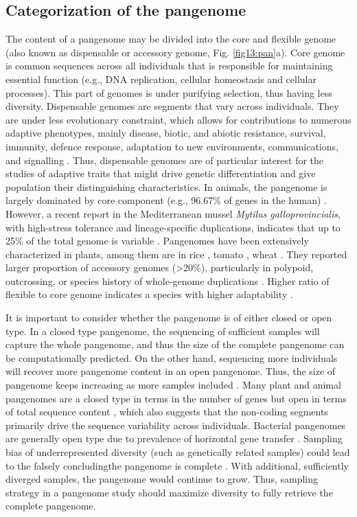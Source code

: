 \documentclass[../main.tex]{subfiles}
\begin{document}
\subsection*{Categorization of the pangenome}

The content of a pangenome may be divided into the core and flexible genome (also known  as dispensable or accessory genome, Fig. \ref{fig13:pan}a). Core genome is common sequences across all individuals that is responsible for maintaining essential function (e.g., DNA replication, cellular homeostasis and cellular processes). This part of genomes is under purifying selection, thus having less diversity. Dispensable genomes are segments that vary across individuals. They are under less evolutionary constraint, which allows for contributions to numerous adaptive phenotypes, mainly disease, biotic, and abiotic resistance, survival, immunity, defence response, adaptation to new environments, communications, and signalling \citep{golicz2020pangenomics}. Thus, dispensable genomes are of particular interest for the studies of adaptive traits that might drive genetic differentiation and give population their distinguishing characteristics. In animals, the pangenome is largely dominated by core component (e.g., 96.67\% of genes in the human) \citep{duan2019hupan}. However, a recent report in the Mediterranean mussel \emph{Mytilus galloprovincialis}, with high-stress tolerance and lineage-specific duplications, indicates that up to 25\% of the total genome is variable \citep{gerdol2020massive}. Pangenomes have been extensively characterized in plants, among them are in rice \citep{zhao2018pan}, tomato \citep{gao2019tomato}, wheat \citep{walkowiak2020multiple}. They reported larger proportion of accessory genomes (>20\%), particularly in polypoid, outcrossing, or species history of whole-genome duplications \citep{tao2019exploring}. Higher ratio of flexible to core genome indicates a species with higher adaptability \citep{tranchant2018plant}. 

It is important to consider whether the pangenome is of either closed or open type. In a closed type pangenome, the sequencing of sufficient samples will capture the whole pangenome, and thus the size of the complete pangenome can be computationally predicted. On the other hand, sequencing more individuals will recover more pangenome content in an open pangenome. Thus, the size of pangenome keeps increasing as more samples included \citep{golicz2020pangenomics}. Many plant and animal pangenomes are a closed type in terms in the number of genes but open in terms of total sequence content \citep{duan2019hupan,golicz2020pangenomics}, which also suggests that the non-coding segments primarily drive the sequence variability across individuals. Bacterial pangenomes  are generally open type due to prevalence of horizontal gene transfer \citep{soucy2015horizontal}. Sampling bias of underrepresented diversity (such as genetically related samples) could lead to the falsely concludingthe pangenome is complete \citep{tranchant2018plant}. With additional, sufficiently  diverged samples, the  pangenome would continue to grow. Thus, sampling strategy in a pangenome study should maximize diversity to fully retrieve the complete pangenome. 
\end{document}
